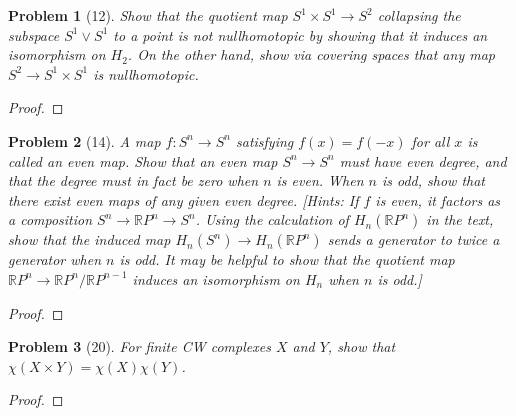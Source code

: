 \documentclass[10pt]{article}
\newcommand{\sk}{\vskip 10mm}
\newcommand{\bb}[1]{\mathbb{#1}}
\theoremstyle{plain}
\newtheorem{problem}{Problem}
\theoremstyle{remark}
\begin{document}
\begin{problem}[12]
  Show that the quotient map $S^1\times S^1\rightarrow S^2$ collapsing the
  subspace $S^1\vee S^1$ to a point is not nullhomotopic
  by showing that it induces an isomorphism on $H_2$. On the
  other hand, show via covering spaces that any map
  $S^2\rightarrow S^1\times S^1$ is nullhomotopic.
\end{problem}

\begin{proof}
  
\end{proof}

\sk

\begin{problem}[14]
  A map $f:S^n\rightarrow S^n$ satisfying $f(x)=f(-x)$ for all $x$ is called
  an even map. Show that an even map $S^n\rightarrow S^n$ must have even
  degree, and that the degree must in fact be zero when $n$ is even.
  When $n$ is odd, show that there exist even maps of any given even
  degree. [Hints: If $f$ is even, it factors as a composition
  $S^n\rightarrow\bb{R}P^n\rightarrow S^n$. Using the calculation of
  $H_n(\bb{R}P^n)$ in the text, show that the induced map
  $H_n(S^n)\rightarrow H_n(\bb{R}P^n)$ sends a generator to twice a
  generator when $n$ is odd. It may be helpful to show that the
  quotient map $\bb{R}P^n\rightarrow \bb{R}P^n/\bb{R}P^{n-1}$ induces an
  isomorphism on $H_n$ when $n$ is odd.]
\end{problem}

\begin{proof}
  
\end{proof}

\sk

\begin{problem}[20]
  For finite CW complexes $X$ and $Y$, show that
  $\chi(X\times Y)=\chi(X)\chi(Y)$.
\end{problem}

\begin{proof}
  
\end{proof}

\sk

\end{document}
